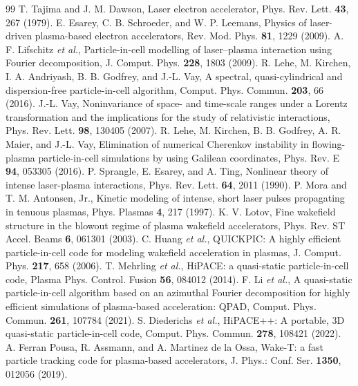 \documentclass[preprint,12pt]{elsarticle}
\begin{document}
\begin{thebibliography}{99}
 T. Tajima and J. M. Dawson, Laser electron accelerator, Phys. Rev. Lett. \textbf{43}, 267 (1979).
 E. Esarey, C. B. Schroeder, and W. P. Leemans, Physics of laser-driven plasma-based electron accelerators, Rev. Mod. Phys. \textbf{81}, 1229 (2009).
 A. F. Lifschitz \textit{et al.}, Particle-in-cell modelling of laser--plasma interaction using Fourier decomposition, J. Comput. Phys. \textbf{228}, 1803 (2009).
 R. Lehe, M. Kirchen, I. A. Andriyash, B. B. Godfrey, and J.-L. Vay, A spectral, quasi-cylindrical and dispersion-free particle-in-cell algorithm, Comput. Phys. Commun. \textbf{203}, 66 (2016).
 J.-L. Vay, Noninvariance of space- and time-scale ranges under a Lorentz transformation and the implications for the study of relativistic interactions, Phys. Rev. Lett. \textbf{98}, 130405 (2007).
 R. Lehe, M. Kirchen, B. B. Godfrey, A. R. Maier, and J.-L. Vay, Elimination of numerical Cherenkov instability in flowing-plasma particle-in-cell simulations by using Galilean coordinates, Phys. Rev. E \textbf{94}, 053305 (2016).
 P. Sprangle, E. Esarey, and A. Ting, Nonlinear theory of intense laser-plasma interactions, Phys. Rev. Lett. \textbf{64}, 2011 (1990).
 P. Mora and T. M. Antonsen, Jr., Kinetic modeling of intense, short laser pulses propagating in tenuous plasmas, Phys. Plasmas \textbf{4}, 217 (1997).
 K. V. Lotov, Fine wakefield structure in the blowout regime of plasma wakefield accelerators, Phys. Rev. ST Accel. Beams \textbf{6}, 061301 (2003).
 C. Huang \textit{et al.}, QUICKPIC: A highly efficient particle-in-cell code for modeling wakefield acceleration in plasmas, J. Comput. Phys. \textbf{217}, 658 (2006).
 T. Mehrling \textit{et al.}, HiPACE: a quasi-static particle-in-cell code, Plasma Phys. Control. Fusion \textbf{56}, 084012 (2014).
 F. Li \textit{et al.}, A quasi-static particle-in-cell algorithm based on an azimuthal Fourier decomposition for highly efficient simulations of plasma-based acceleration: QPAD, Comput. Phys. Commun. \textbf{261}, 107784 (2021).
 S. Diederichs \textit{et al.}, HiPACE++: A portable, 3D quasi-static particle-in-cell code, Comput. Phys. Commun. \textbf{278}, 108421 (2022).
 A. Ferran Pousa, R. Assmann, and A. Martinez de la Ossa, Wake-T: a fast particle tracking code for plasma-based accelerators, J. Phys.: Conf. Ser. \textbf{1350}, 012056 (2019).

\end{thebibliography}
\end{document}
